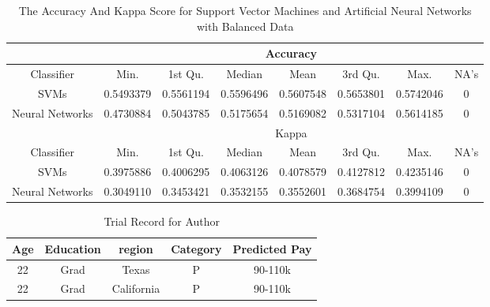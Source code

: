 \documentclass{article}
\begin{document}
    \begin{center}
        \begin{table}
            \centering
            \begin{tabular}{ |c|c|c|c|c|c|c|c| }
                \hline
                & \multicolumn{7}{|c|}{Accuracy} \\
                \hline
                Classifier & Min. & 1st Qu. & Median & Mean & 3rd Qu. & Max. & NA's \\
                SVMs & 0.5493379 & 0.5561194 & 0.5596496 & 0.5607548 & 0.5653801 & 0.5742046 & 0 \\
                Neural Networks & 0.4730884 & 0.5043785 & 0.5175654 & 0.5169082 & 0.5317104 & 0.5614185 & 0 \\
                \hline
                & \multicolumn{7}{|c|}{Kappa} \\
                \hline
                Classifier & Min. & 1st Qu. & Median & Mean & 3rd Qu. & Max. & NA's \\
                SVMs & 0.3975886 & 0.4006295 & 0.4063126 & 0.4078579 & 0.4127812 & 0.4235146 & 0 \\
                Neural Networks & 0.3049110 & 0.3453421 & 0.3532155 & 0.3552601 & 0.3684754 & 0.3994109 & 0 \\
                \hline
            \end{tabular}
            \caption{The Accuracy And Kappa Score for Support Vector Machines and Artificial Neural Networks with Balanced Data}
            \label{tab:13}
        \end{table}
    \end{center}

    \begin{center}
        \begin{table}
            \centering
            \begin{tabular}{ |c|c|c|c|c| }
                \hline
                Age & Education & region & Category & Predicted Pay \\
                \hline
                22 & Grad & Texas & P & 90-110k \\
                22 & Grad & California & P & 90-110k \\
                \hline
            \end{tabular}
            \caption{Trial Record for Author}
            \label{tab:14}
        \end{table}
    \end{center}
\end{document}
